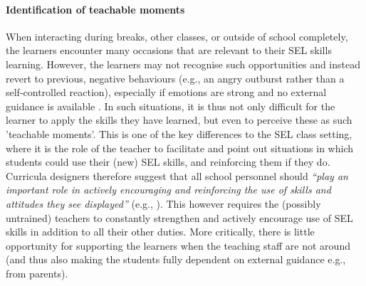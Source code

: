 \documentclass[prodmode,acmtochi]{acmsmall}
\newcommand{\inqq}[1]{\textrm{\textit{``#1''}}}
\begin{document}
\paragraph{Identification of teachable moments}
When interacting during breaks, other classes, or outside of school completely, the learners encounter many occasions that are relevant to their SEL skills learning. However, the learners may not recognise such opportunities and instead revert to previous, negative behaviours (e.g., an angry outburst rather than a self-controlled reaction), especially if emotions are strong and no external guidance is available \cite[p. 56]{Elias1997}.  In such situations, it is thus not only difficult for the learner to apply the skills they have learned, but even to perceive these as such 'teachable moments'. This is one of the key differences to the SEL class setting, where it is the role of the teacher to facilitate and point out situations in which students could use their (new) SEL skills, and reinforcing them if they do. 
%
Curricula designers therefore suggest that all school personnel should \inqq{play an important role in actively encouraging and reinforcing the use of skills and attitudes they see displayed} (e.g., \cite[p. 56]{Elias1997}). This however requires the (possibly untrained) teachers to constantly strengthen and actively encourage use of SEL skills in addition to all their other duties. More critically, there is little opportunity for supporting the learners when the teaching staff are not around (and thus also making the students fully dependent on external guidance e.g., from parents). 
\end{document}
